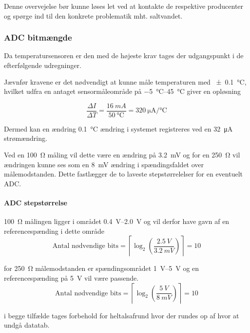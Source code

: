 Denne overvejelse bør kunne løses let ved at kontakte de respektive producenter og spørge ind til den konkrete problematik mht. saltvandet.


\subsubsection{ADC bitmængde}

Da temperatursensoren er den med de højeste krav tages der udgangspunkt i de efterfølgende udregninger.

Jævnfør kravene er det nødvendigt at kunne måle temperaturen med \SI{\pm 0.1}{\celsius}, hvilket udfra en antaget sensormåleområde på \SIrange{-5}{45}{\celsius} giver en opløsning

\begin{equation}
    \frac{\Delta I}{\Delta T} = \frac{\SI{16}{mA}}{\SI{50}{\celsius}} = \SI{320}{\micro\ampere\per\celsius}
\end{equation}

Dermed kan en ændring \SI{0.1}{\celsius} ændring i systemet registreres ved en \SI{32}{\micro\ampere} strømændring. 

Ved en \SI{100}{\ohm} måling vil dette være en ændring på \SI{3.2}{mV} og for en \SI{250}{\ohm} vil ændringen kunne ses som en \SI{8}{mV} ændring i spændingsfaldet over målemodstanden. Dette fastlægger de to laveste stepstørrelelser for en eventuelt ADC.

\paragraph{ADC stepstørrelse}

\SI{100}{\ohm} målingen ligger i området \SIrange{0.4}{2.0}{\volt} og vil derfor have gavn af en referencespænding i dette område 
\begin{equation}
   \textrm{Antal nødvendige bits} =\left\lceil \log_2 \left( \frac{\SI{2.5}{V}}{\SI{3.2}{mV}}\right)\right\rceil  = 10
\end{equation}

for \SI{250}{\ohm} målemodstanden er spændingsområdet \SIrange{1}{5}{V} og en referencespænding på \SI{5}{V} vil være passende.
\begin{equation}
    \textrm{Antal nødvendige bits} =\left\lceil \log_2 \left( \frac{\SI{5}{V}}{\SI{8}{mV}}\right)\right\rceil  = 10
 \end{equation}

 i begge tilfælde tages forbehold for heltalsafrund hvor der rundes op af hvor at undgå datatab.

